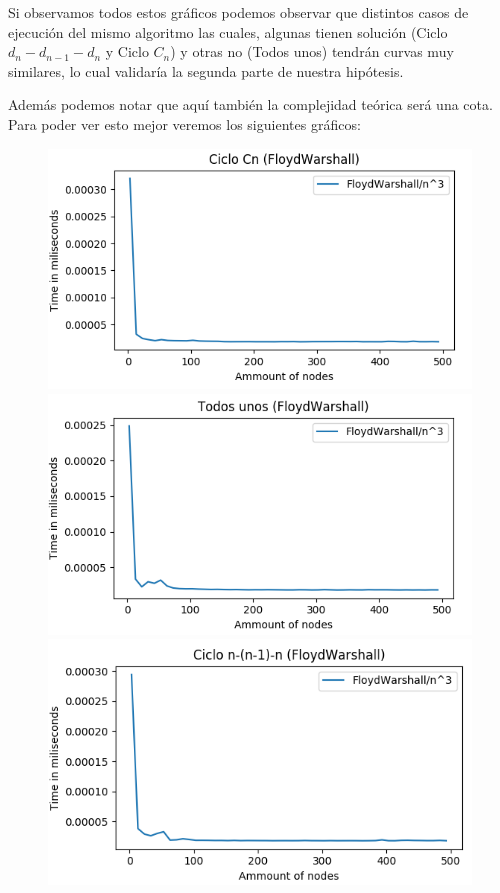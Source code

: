 \documentclass[11pt,a4paper]{article}
\begin{document}
Si observamos todos estos gr\'aficos podemos observar que distintos casos de ejecuci\'on del mismo algoritmo las cuales, algunas tienen soluci\'on (Ciclo $d_{n}-d_{n-1}-d_{n}$ y Ciclo $C_{n}$) y otras no (Todos unos) tendr\'an curvas muy similares, lo cual validar\'ia la segunda parte de nuestra hip\'otesis. 

Adem\'as podemos notar que aqu\'i tambi\'en la complejidad te\'orica ser\'a una cota. Para poder ver esto mejor veremos los siguientes gr\'aficos:

 \begin{figure}[h]
     \includegraphics[scale=0.5]{F-W3cn.png}
     \includegraphics[scale=0.5]{F-W3unos.png}
     \includegraphics[scale=0.5]{FW3-nnl1n.png}
 \end{figure}
 \pagebreak
 
\end{document}
